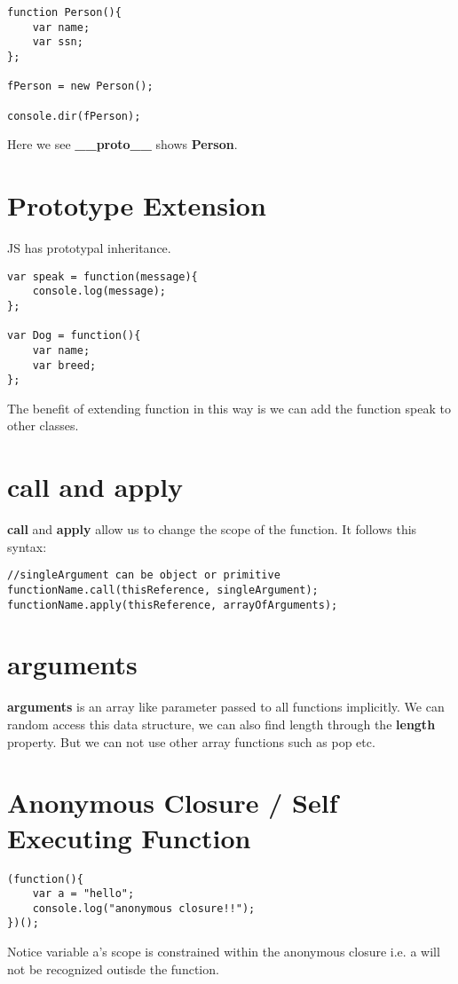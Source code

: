 \documentclass[12pt, a4paper]{article}
\begin{document}
\begin{verbatim}
function Person(){
    var name;
    var ssn;    
};

fPerson = new Person();

console.dir(fPerson);
\end{verbatim}
Here we see \textbf{\_\_proto\_\_} shows \textbf{Person}.

\section{Prototype Extension}
JS has prototypal inheritance.
\begin{verbatim}
var speak = function(message){
    console.log(message);
};

var Dog = function(){
    var name;
    var breed;
};
\end{verbatim}
The benefit of extending function in this way is we can add the function speak to other classes.

\section{call and apply}
\textbf{call} and \textbf{apply} allow us to change the scope of the function. It follows this syntax:
\begin{verbatim}
//singleArgument can be object or primitive
functionName.call(thisReference, singleArgument); 
functionName.apply(thisReference, arrayOfArguments);
\end{verbatim}

\section{arguments}
\textbf{arguments} is an array like parameter passed to all functions implicitly.
We can random access this data structure, we can also find length through the \textbf{length} property.
But we can not use other array functions such as pop etc.

\section{Anonymous Closure / Self Executing Function}
\begin{verbatim}
(function(){
    var a = "hello";
    console.log("anonymous closure!!");
})();
\end{verbatim}
Notice variable a's scope is constrained within the anonymous closure
i.e. a will not be recognized outisde the function.
\end{document}
